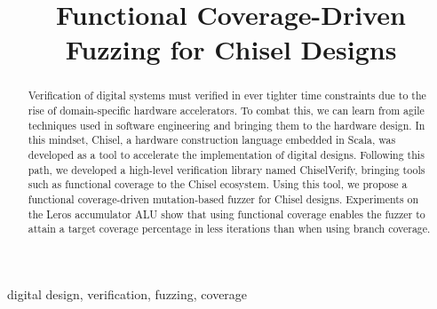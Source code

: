 \documentclass[conference]{IEEEtran}
\newcommand{\todo}[1]{{\color{olive} TODO: #1}}
\newcommand{\martin}[1]{{\color{blue} Martin: #1}}
\begin{document}

\title{Functional Coverage-Driven Fuzzing for Chisel Designs}

\author{


}


\maketitle \thispagestyle{empty}

\begin{abstract}

Verification of digital systems must verified in ever tighter time constraints due to the rise of domain-specific hardware accelerators.
To combat this, we can learn from agile techniques used in software engineering and bringing them to the hardware design.
In this mindset, Chisel, a hardware construction language embedded in Scala, was developed as a tool to accelerate the implementation of digital designs.
Following this path, we developed a high-level verification library named ChiselVerify, bringing tools such as functional coverage to the Chisel ecosystem.
Using this tool, we propose a functional coverage-driven mutation-based fuzzer for Chisel designs.
Experiments on the Leros accumulator ALU show that using functional coverage enables the fuzzer to attain a target coverage percentage in less iterations than when using branch coverage.

\end{abstract}

\begin{IEEEkeywords}
digital design, verification, fuzzing, coverage
\end{IEEEkeywords}
%
%
\end{document}
